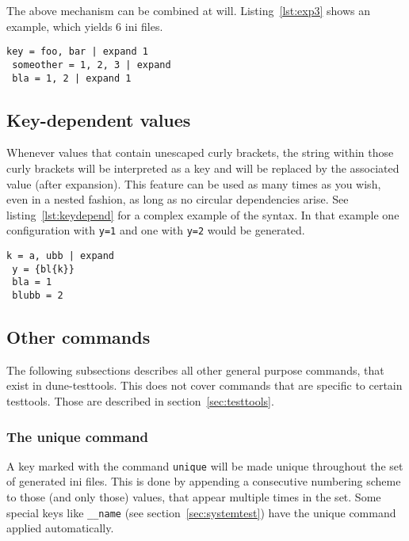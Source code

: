 \documentclass[11pt]{article}
\begin{document}
The above mechanism can be combined at will. Listing~\ref{lst:exp3} shows an example, which yields 6 ini files.

\begin{lstlisting}[caption={A simple combining multiple expansions},label=lst:exp3]
 key = foo, bar | expand 1
 someother = 1, 2, 3 | expand
 bla = 1, 2 | expand 1
\end{lstlisting}

\subsection{Key-dependent values}
\label{sec:keydepend}

Whenever values that contain unescaped curly brackets, the string within those curly brackets will be interpreted as a key and will be replaced by the associated value (after expansion). This feature can be used as many times as you wish, even in a nested fashion, as long as no circular dependencies arise. See listing~\ref{lst:keydepend} for a complex example of the syntax. In that example one configuration with \lstinline!y=1! and one with \lstinline!y=2! would be generated.

\begin{lstlisting}[caption={A complex example of key-dependent value syntax},label=lst:keydepend]
 k = a, ubb | expand
 y = {bl{k}}
 bla = 1
 blubb = 2
\end{lstlisting}

\subsection{Other commands}

The following subsections describes all other general purpose commands, that exist in dune-testtools. This does not cover commands that are specific to certain testtools. Those are described in section~\ref{sec:testtools}.

\subsubsection{The unique command}

A key marked with the command \lstinline!unique! will be made unique throughout the set of generated ini files. This is done by appending a consecutive numbering scheme to those (and only those) values, that appear multiple times in the set. Some special keys like \lstinline!__name! (see section~\ref{sec:systemtest}) have the unique command applied automatically. \\
\end{document}
